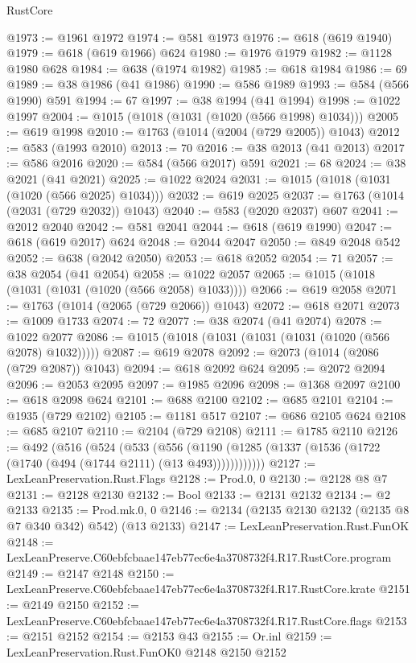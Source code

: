 \begin{lexlean}{RustCore}
\begin{coremodule}
@1973 := @1961 @1972
@1974 := @581 @1973
@1976 := @618 (@619 @1940)
@1979 := @618 (@619 @1966) @624
@1980 := @1976 @1979
@1982 := @1128 @1980 @628
@1984 := @638 (@1974 @1982)
@1985 := @618 @1984
@1986 := 69
@1989 := @38 @1986 (@41 @1986)
@1990 := @586 @1989
@1993 := @584 (@566 @1990) @591
@1994 := 67
@1997 := @38 @1994 (@41 @1994)
@1998 := @1022 @1997
@2004 := @1015 (@1018 (@1031 (@1020 (@566 @1998) @1034)))
@2005 := @619 @1998
@2010 := @1763 (@1014 (@2004 (@729 @2005)) @1043)
@2012 := @583 (@1993 @2010)
@2013 := 70
@2016 := @38 @2013 (@41 @2013)
@2017 := @586 @2016
@2020 := @584 (@566 @2017) @591
@2021 := 68
@2024 := @38 @2021 (@41 @2021)
@2025 := @1022 @2024
@2031 := @1015 (@1018 (@1031 (@1020 (@566 @2025) @1034)))
@2032 := @619 @2025
@2037 := @1763 (@1014 (@2031 (@729 @2032)) @1043)
@2040 := @583 (@2020 @2037) @607
@2041 := @2012 @2040
@2042 := @581 @2041
@2044 := @618 (@619 @1990)
@2047 := @618 (@619 @2017) @624
@2048 := @2044 @2047
@2050 := @849 @2048 @542
@2052 := @638 (@2042 @2050)
@2053 := @618 @2052
@2054 := 71
@2057 := @38 @2054 (@41 @2054)
@2058 := @1022 @2057
@2065 := @1015 (@1018 (@1031 (@1031 (@1020 (@566 @2058) @1033))))
@2066 := @619 @2058
@2071 := @1763 (@1014 (@2065 (@729 @2066)) @1043)
@2072 := @618 @2071
@2073 := @1009 @1733
@2074 := 72
@2077 := @38 @2074 (@41 @2074)
@2078 := @1022 @2077
@2086 := @1015 (@1018 (@1031 (@1031 (@1031 (@1020 (@566 @2078) @1032)))))
@2087 := @619 @2078
@2092 := @2073 (@1014 (@2086 (@729 @2087)) @1043)
@2094 := @618 @2092 @624
@2095 := @2072 @2094
@2096 := @2053 @2095
@2097 := @1985 @2096
@2098 := @1368 @2097
@2100 := @618 @2098 @624
@2101 := @688 @2100
@2102 := @685 @2101
@2104 := @1935 (@729 @2102)
@2105 := @1181 @517
@2107 := @686 @2105 @624
@2108 := @685 @2107
@2110 := @2104 (@729 @2108)
@2111 := @1785 @2110
@2126 := @492
    (@516
      (@524
        (@533
          (@556 (@1190 (@1285 (@1337 (@1536 (@1722 (@1740 (@494 (@1744 @2111) (@13 @493))))))))))))
@2127 := LexLeanPreservation.Rust.Flags
@2128 := Prod.{0, 0}
@2130 := @2128 @8 @7
@2131 := @2128 @2130
@2132 := Bool
@2133 := @2131 @2132
@2134 := @2 @2133
@2135 := Prod.mk.{0, 0}
@2146 := @2134 (@2135 @2130 @2132 (@2135 @8 @7 @340 @342) @542) (@13 @2133)
@2147 := LexLeanPreservation.Rust.FunOK
@2148 := LexLeanPreserve.C60ebfcbaae147eb77ec6e4a3708732f4.R17.RustCore.program
@2149 := @2147 @2148
@2150 := LexLeanPreserve.C60ebfcbaae147eb77ec6e4a3708732f4.R17.RustCore.krate
@2151 := @2149 @2150
@2152 := LexLeanPreserve.C60ebfcbaae147eb77ec6e4a3708732f4.R17.RustCore.flags
@2153 := @2151 @2152
@2154 := @2153 @43
@2155 := Or.inl
@2159 := LexLeanPreservation.Rust.FunOK0 @2148 @2150 @2152

\end{coremodule}
\end{lexlean}
